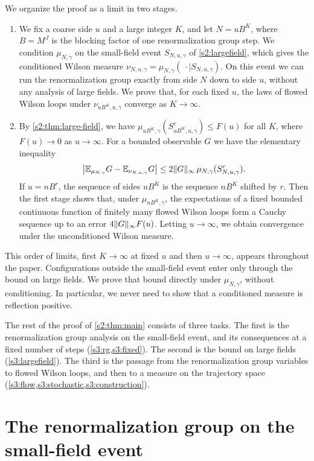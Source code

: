 We organize the proof as a limit in two stages.
\begin{enumerate}
\item We fix a coarse side $u$ and a large integer $K$, and let $N=uB^K$, where $B=M^J$ is the blocking factor of one renormalization group step. We condition $\mu_{N,\gamma}$ on the small-field event $S_{N,u,\gamma}$ of \cref{s2:largefield}, which gives the conditioned Wilson measure $\nu_{N,u,\gamma}=\mu_{N,\gamma}(\,\cdot\mid S_{N,u,\gamma})$. On this event we can run the renormalization group exactly from side $N$ down to side $u$, without any analysis of large fields. We prove that, for each fixed $u$, the laws of flowed Wilson loops under $\nu_{uB^K,u,\gamma}$ converge as $K\to\infty$.
\item By \cref{s2:thm:large-field}, we have $\mu_{uB^K,\gamma}(S_{uB^K,u,\gamma}^c)\le F(u)$ for all $K$, where $F(u)\to0$ as $u\to\infty$. For a bounded observable $G$ we have the elementary inequality
\begin{equation}\label{s3:eq:transfer}
 \bigl\lvert\mathbb E_{\mu_{N,\gamma}}G-\mathbb E_{\nu_{N,u,\gamma}}G\bigr\rvert\le2\lVert G\rVert_\infty\,\mu_{N,\gamma}(S_{N,u,\gamma}^c).
\end{equation}
If $u=nB^r$, the sequence of sides $uB^K$ is the sequence $nB^K$ shifted by $r$. Then the first stage shows that, under $\mu_{nB^K,\gamma}$, the expectations of a fixed bounded continuous function of finitely many flowed Wilson loops form a Cauchy sequence up to an error $4\lVert G\rVert_\infty F(u)$. Letting $u\to\infty$, we obtain convergence under the unconditioned Wilson measure.
\end{enumerate}
This order of limits, first $K\to\infty$ at fixed $u$ and then $u\to\infty$, appears throughout the paper. Configurations outside the small-field event enter only through the bound on large fields. We prove that bound directly under $\mu_{N,\gamma}$, without conditioning. In particular, we never need to show that a conditioned measure is reflection positive.

The rest of the proof of \cref{s2:thm:main} consists of three tasks. The first is the renormalization group analysis on the small-field event, and its consequences at a fixed number of steps (\cref{s3:rg,s3:fixed}). The second is the bound on large fields (\cref{s3:largefield}). The third is the passage from the renormalization group variables to flowed Wilson loops, and then to a measure on the trajectory space (\cref{s3:flow,s3:stochastic,s3:construction}).

\section{The renormalization group on the small-field event}\label{s3:rg}

